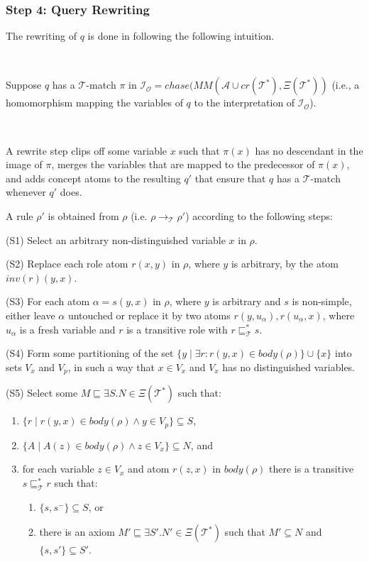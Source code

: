 \documentclass[oneside]{book}
\newcommand{\Onto}{\mathcal{O}}
\newcommand{\T}{\mathcal{T}}
\newcommand{\A}{\mathcal{A}}
\newcommand{\dlisa}{\sqsubseteq}
\begin{document}
\subsubsection{Step 4: Query Rewriting}

The rewriting of $q$ is done in following the following intuition.

\

Suppose $q$ has a $\T$-match $\pi$ in $\mathcal{I_\Onto}=chase(MM(\A \cup cr(\T^*),\Xi(\T^*))$ (i.e., a homomorphism mapping the variables of $q$ to the interpretation of $\mathcal{I_\Onto}$). 

\

A rewrite step clips off some variable $x$ such that $\pi(x)$ has no descendant in the
image of $\pi$, merges the variables that are mapped to the predecessor
of $\pi(x)$, and adds concept atoms to the resulting $q'$ that ensure that $q$ has a $\T $-match whenever $q'$ does.

A rule $\rho'$ is obtained from $\rho$ (i.e. $\rho \rightarrow_\T \rho'$) according to the following steps:

(S1) Select an arbitrary non-distinguished variable $x$ in $\rho$.

(S2) Replace each role atom $r(x,y)$ in $\rho$, where $y$ is arbitrary,	by the atom $inv(r)(y,x)$.

(S3) For each atom $\alpha = s(y,x)$ in $\rho$, where $y$ is arbitrary
and $s$ is non-simple, either leave $\alpha$ untouched or replace
it by two atoms $r(y,u_\alpha),r(u_\alpha,x)$, where $u_\alpha$ is
a fresh variable and $r$ is a transitive role with $r \dlisa^*_\T s$.

(S4) Form some partitioning of the set $\{y \mid \exists r : r(y,x) \in	body(\rho) \} \cup \{x\}$ into sets $V_x$ and $V_p$, in such a way that $x \in V_x$ and $V_x$ has no distinguished variables.

(S5) Select some $M \dlisa \exists S.N \in \Xi(\T^*)$ such that:

\begin{enumerate}
	\item  $\{r \mid r(y,x) \in body(\rho) \wedge y \in V_p \} \subseteq S$,
	
	\item $\{ A \mid A(z) \in body(\rho) \wedge z \in V_x \} \subseteq N$, and
	
	\item for each variable $z \in V_x$ and atom $r(z,x)$ in $body(\rho)$ there is a transitive $s \dlisa_\T^* r$ such that:
	\begin{enumerate}
		\item $\{s,s^-\} \subseteq S$, or
		\item there is an axiom $M' \dlisa \exists S'.N' \in \Xi(\T^*)$ such that $M' \subseteq N$ and $\{s,s'\} \subseteq S'$.
	\end{enumerate}
\end{enumerate}
\end{document}
